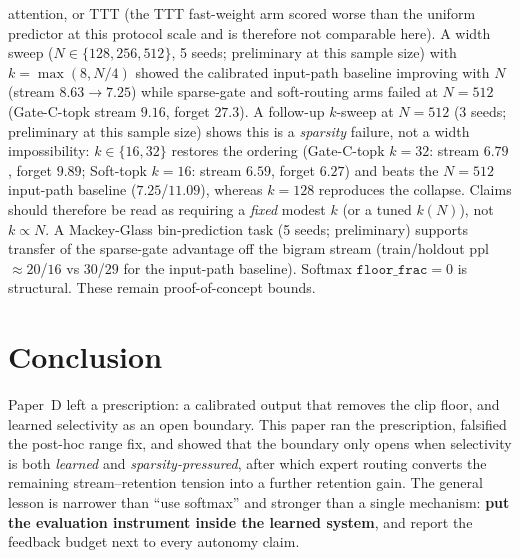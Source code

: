 \documentclass[preprint,12pt]{elsarticle}
\begin{document}
attention, or TTT (the TTT fast-weight arm scored worse than the
uniform predictor at this protocol scale and is therefore not
comparable here). A width sweep
($N\in\{128,256,512\}$, 5 seeds; preliminary at this sample size) with $k=\max(8,N/4)$ showed the
calibrated input-path baseline improving with $N$ (stream
$8.63\to7.25$) while sparse-gate and soft-routing arms failed at
$N=512$ (Gate-C-topk stream $9.16$, forget $27.3$). A follow-up
$k$-sweep at $N=512$ (3 seeds; preliminary at this sample size) shows this is a \emph{sparsity}
failure, not a width impossibility: $k\in\{16,32\}$ restores the
ordering (Gate-C-topk $k=32$: stream $6.79$, forget $9.89$; Soft-topk
$k=16$: stream $6.59$, forget $6.27$) and beats the $N=512$
input-path baseline ($7.25$/$11.09$), whereas $k=128$ reproduces the
collapse. Claims should therefore be read as requiring a
\emph{fixed} modest $k$ (or a tuned $k(N)$), not $k\propto N$. A
Mackey-Glass bin-prediction task (5 seeds; preliminary) supports transfer of the
sparse-gate advantage off the bigram stream (train/holdout ppl
$\approx20$/$16$ vs $30$/$29$ for the input-path baseline).
Softmax $\texttt{floor\_frac}=0$ is structural. These remain
proof-of-concept bounds.

\section{Conclusion}
\label{sec:conclusion}

Paper~D left a prescription: a calibrated output that removes the clip
floor, and learned selectivity as an open boundary. This paper ran the
prescription, falsified the post-hoc range fix, and showed that the
boundary only opens when selectivity is both \emph{learned} and
\emph{sparsity-pressured}, after which expert routing converts the
remaining stream--retention tension into a further retention gain. The
general lesson is narrower than ``use softmax'' and stronger than a
single mechanism: \textbf{put the evaluation instrument inside the
learned system}, and report the feedback budget next to every
autonomy claim.
\end{document}
